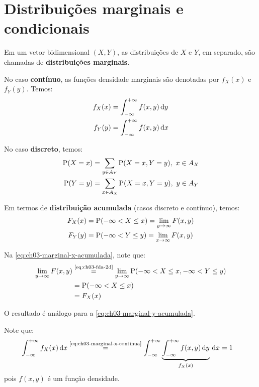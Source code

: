 \section{Distribuições marginais e condicionais}

Em um vetor bidimensional $(X, Y)$, as distribuições de $X$ e $Y$,
em separado, são chamadas de \textbf{distribuições marginais}.

No caso \textbf{contínuo}, as funções densidade marginais
são denotadas por $f_X(x)$ e $f_Y(y)$. Temos:
\begin{align}
    f_X(x) &= \int_{-\infty}^{+\infty} f(x, y) \,\mathrm{d} y
        \label{eq:ch03-marginal-x-continua} \\
    f_Y(y) &= \int_{-\infty}^{+\infty} f(x, y) \,\mathrm{d} x
        \label{eq:ch03-marginal-y-continua}
\end{align}

No caso \textbf{discreto}, temos:
\begin{align}
    \operatorname{P}(X = x) &= \sum_{y \in A_Y} \operatorname{P}(X = x, Y = y),\ x \in A_X
        \label{eq:ch03-marginal-x-discreta} \\
    \operatorname{P}(Y = y) &= \sum_{x \in A_X} \operatorname{P}(X = x, Y = y),\ y \in A_Y
        \label{eq:ch03-marginal-y-discreta}
\end{align}

Em termos de \textbf{distribuição acumulada} (casos discreto e contínuo),
temos:
\begin{align}
    F_X(x) &= \operatorname{P}(-\infty < X \le x) = \lim_{y\to \infty} F(x, y) 
        \label{eq:ch03-marginal-x-acumulada} \\
    F_Y(y) &= \operatorname{P}(-\infty < Y \le y) = \lim_{x\to \infty} F(x, y) 
        \label{eq:ch03-marginal-y-acumulada}
\end{align}

\begin{obs}
    Na \cref{eq:ch03-marginal-x-acumulada}, note que:
    \begin{align*}
        \lim_{y\to \infty} F(x, y) 
        &\overset{\text{\Cref{eq:ch03-fda-2d}}}{=}
        \lim_{y\to \infty} \Prob(-\infty < X \le x, -\infty < Y \le y) \\
        &= \Prob(-\infty < X \le x) \\
        &= F_X(x)
    \end{align*}

    O resultado é análogo para a \cref{eq:ch03-marginal-y-acumulada}.
\end{obs}

\begin{obs}
    Note que:
    \begin{align*}
        \int_{-\infty}^{+\infty} f_X(x) \wrt x
        &\overset{\text{\Cref{eq:ch03-marginal-x-continua}}}{=}
            \int_{-\infty}^{+\infty}
                \underbrace{\int_{-\infty}^{+\infty} f(x, y) \wrt y}_{f_X(x)}
            \wrt x = 1
    \end{align*}
    pois $f(x, y)$ é um função densidade.
\end{obs}

